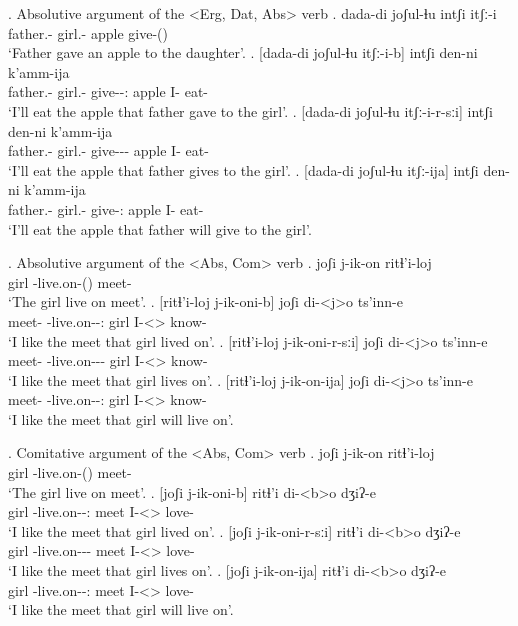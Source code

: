 \ex. Absolutive argument of the <Erg, Dat, Abs> verb
	\ag. dada-di joʃul-ɬu intʃi itʃː-i\\
			{father.\Obl-\Erg} {girl.\Obl-\Dat} apple {give-\Pst(\Aor)}\\
			\glt `Father gave an apple to the daughter'.
	\bg. [dada-di joʃul-ɬu itʃː-i-b] intʃi den-ni k'amm-ija\\
			{father.\Obl-\Erg} {girl.\Obl-\Dat} {give-\Pst-\Ptcp:\Pst} {apple} {I-\Erg} {eat-\Fut} \\
			\glt `I'll eat the apple that father gave to the girl'.
	\bg. [dada-di joʃul-ɬu itʃː-i-r-sːi] intʃi den-ni k'amm-ija\\
			{father.\Obl-\Erg} {girl.\Obl-\Dat} {give-\Pst-\Prog-\Attr} {apple} {I-\Erg} {eat-\Fut} \\
			\glt `I'll eat the apple that father gives to the girl'.			
	\bg. [dada-di joʃul-ɬu itʃː-ija] intʃi den-ni k'amm-ija\\
			{father.\Obl-\Erg} {girl.\Obl-\Dat} {give-\Ptcp:\Fut} {apple} {I-\Erg} {eat-\Fut} \\
			\glt `I'll eat the apple that father will give to the girl'.

\ex. Absolutive argument of the <Abs, Com> verb
	\ag. joʃi j-ik-on ritɬ'i-loj\\
			girl {\F-live.on-\Pst(\Aor)} {meet-\Com}\\
			\glt `The girl live on meet'.
	\bg. [ritɬ'i-loj j-ik-oni-b] joʃi di-<j>o ts'inn-e\\
			{meet-\Com} {\F-live.on-\Pst-\Ptcp:\Pst} girl {I-<\F>\Aff} {know-\Hab}\\
			\glt `I like the meet that girl lived on'.
	\bg. [ritɬ'i-loj j-ik-oni-r-sːi] joʃi di-<j>o ts'inn-e\\
			{meet-\Com} {\F-live.on-\Pst-\Prog-\Attr} girl {I-<\F>\Aff} {know-\Hab}\\
			\glt `I like the meet that girl lives on'.			
	\bg. [ritɬ'i-loj j-ik-on-ija] joʃi di-<j>o ts'inn-e\\
			{meet-\Com} {\F-live.on-\Npst-\Ptcp:\Fut} girl {I-<\F>\Aff} {know-\Hab}\\
			\glt `I like the meet that girl will live on'.

\ex. Comitative argument of the <Abs, Com> verb
	\ag. joʃi j-ik-on ritɬ'i-loj\\
			girl {\F-live.on-\Pst(\Aor)} {meet-\Com}\\
			\glt `The girl live on meet'.
	\bg. [joʃi j-ik-oni-b] ritɬ'i di-<b>o dʒiʔ-e\\
			girl {\F-live.on-\Pst-\Ptcp:\Pst} meet {I-<\Nanf>\Aff} {love-\Hab}\\
			\glt `I like the meet that girl lived on'.
	\bg. [joʃi j-ik-oni-r-sːi] ritɬ'i di-<b>o dʒiʔ-e\\
			girl {\F-live.on-\Pst-\Prog-\Attr} meet {I-<\Nanf>\Aff} {love-\Hab}\\
			\glt `I like the meet that girl lives on'.			
	\bg. [joʃi j-ik-on-ija] ritɬ'i di-<b>o dʒiʔ-e\\
			girl {\F-live.on-\Npst-\Ptcp:\Fut} meet {I-<\Nanf>\Aff} {love-\Hab}\\
			\glt `I like the meet that girl will live on'.


